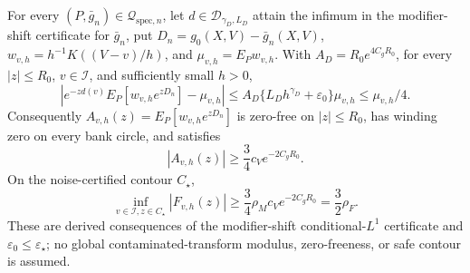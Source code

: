 For every \((P,\bar g_n)\in\mathcal Q_{\mathrm{spec},n}\), let \(d\in\mathcal D_{\gamma_D,L_D}\) attain the infimum in the modifier-shift certificate for \(\bar g_n\), put \(D_n=g_0(X,V)-\bar g_n(X,V)\), \(w_{v,h}=h^{-1}K((V-v)/h)\), and \(\mu_{v,h}=E_Pw_{v,h}\). With \(A_D=R_0e^{4C_gR_0}\), for every \(|z|\le R_0\), \(v\in\mathcal I\), and sufficiently small \(h>0\),
\[
 \left|e^{-zd(v)}E_P[w_{v,h}e^{zD_n}]-\mu_{v,h}\right|
 \le A_D\{L_Dh^{\gamma_D}+\varepsilon_0\}\mu_{v,h}
 \le\mu_{v,h}/4.
\]
Consequently \(A_{v,h}(z)=E_P[w_{v,h}e^{zD_n}]\) is zero-free on \(|z|\le R_0\), has winding zero on every bank circle, and satisfies
\[
 |A_{v,h}(z)|\ge\frac34c_Ve^{-2C_gR_0}.
\]
On the noise-certified contour \(C_\star\),
\[
 \inf_{v\in\mathcal I,z\in C_\star}|F_{v,h}(z)|
 \ge\frac34\rho_Mc_Ve^{-2C_gR_0}=\frac32\rho_F.
\]
These are derived consequences of the modifier-shift conditional-\(L^1\) certificate and \(\varepsilon_0\le\varepsilon_\star\); no global contaminated-transform modulus, zero-freeness, or safe contour is assumed.